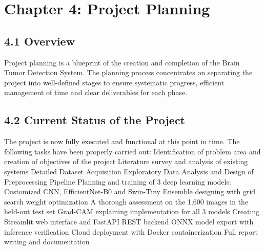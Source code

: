 \documentclass[12pt,a4paper,oneside]{report}
\begin{document}
\chapter*{Chapter 4: Project Planning}
\section*{4.1 Overview}
Project planning is a blueprint of the creation and completion of the Brain Tumor Detection System. The planning process concentrates on separating the project into well-defined stages to ensure systematic progress, efficient management of time and clear deliverables for each phase.
\section*{4.2 Current Status of the Project}
The project is now fully executed and functional at this point in time. The following tasks have been properly carried out:
Identification of problem area and creation of objectives of the project
Literature survey and analysis of existing systems
Detailed Dataset Acquisition Exploratory Data Analysis and Design of Preprocessing Pipeline
Planning and training of 3 deep learning models: Customized CNN, EfficientNet-B0 and Swin-Tiny
Ensemble designing with grid search weight optimization
A thorough assessment on the 1,600 images in the held-out test set
Grad-CAM explaining implementation for all 3 models
Creating Streamlit web interface and FastAPI REST backend
ONNX model export with inference verification 
Cloud deployment with Docker containerization
Full report writing and documentation
\end{document}
